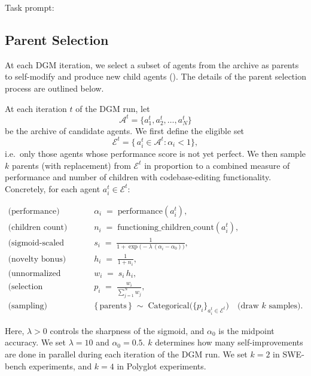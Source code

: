 \documentclass{article}
\begin{document}
Task prompt:


\subsection{Parent Selection}
\label{app:parent-select}

At each DGM iteration, we select a subset of agents from the archive as parents to self-modify and produce new child agents (). The details of the parent selection process are outlined below.

At each iteration \(t\) of the DGM run, let
\[
\mathcal{A}^t = \{a_1^t, a_2^t, \dots, a_N^t\}
\]
be the archive of candidate agents.  We first define the eligible set
\[
\mathcal{E}^t = \bigl\{\,a_i^t \in \mathcal{A}^t : \alpha_i < 1 \bigr\},
\]
i.e.\ only those agents whose performance score is not yet perfect. We then sample \(k\) parents (with replacement) from \(\mathcal{E}^t\) in proportion to a combined measure of performance and number of children with codebase-editing functionality. Concretely, for each agent \(a_i^t \in \mathcal{E}^t\):

\begin{align}
\text{(performance)}\quad & \alpha_i \;=\; \mathrm{performance}(a_i^t), 
\\
\text{(children count)}\quad & n_i \;=\; \mathrm{functioning\_children\_count}(a_i^t),
\\[6pt]
\text{(sigmoid‐scaled performance)}\quad 
& s_i \;=\; \frac{1}{1 + \exp\!\bigl(-\lambda\,(\alpha_i - \alpha_0)\bigr)},
\\[4pt]
\text{(novelty bonus)}\quad 
& h_i \;=\; \frac{1}{1 + n_i},
\\[4pt]
\text{(unnormalized weight)}\quad 
& w_i \;=\; s_i\,h_i,
\\[4pt]
\text{(selection probability)}\quad 
& p_i \;=\; \frac{w_i}{\sum_{j=1}^{N} w_j},
\\[8pt]
\text{(sampling)}\quad 
& \{\,\text{parents}\,\} \;\sim\; \mathrm{Categorical}\bigl(\{p_i\}_{a_i^t \in \mathcal{E}^t}\bigr)\quad\text{(draw \(k\) samples).}
\end{align}

Here, \(\lambda>0\) controls the sharpness of the sigmoid, and \(\alpha_0\) is the midpoint accuracy. We set \(\lambda=10\) and \(\alpha_0=0.5\). \(k\) determines how many self-improvements are done in parallel during each iteration of the DGM run. We set \(k=2\) in SWE-bench experiments, and \(k=4\) in Polyglot experiments.
\end{document}
